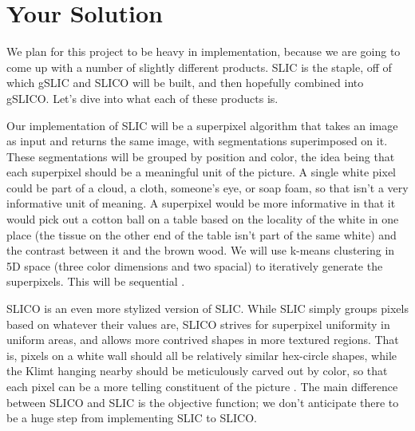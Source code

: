 \documentclass[11pt]{article}
\begin{document}


\section {Your Solution}\label{soln}

We plan for this project to be heavy in implementation, because we are going to come up with a number of slightly different products. SLIC is the staple, off of which gSLIC and SLICO will be built, and then hopefully combined into gSLICO. Let's dive into what each of these products is.

Our implementation of SLIC will be a superpixel algorithm that takes an image as input and returns the same image, with segmentations superimposed on it. These segmentations will be grouped by position and color, the idea being that each superpixel should be a meaningful unit of the picture. A single white pixel could be part of a cloud, a cloth, someone's eye, or soap foam, so that isn't a very informative unit of meaning. A superpixel would be more informative in that it would pick out a cotton ball on a table based on the locality of the white in one place (the tissue on the other end of the table isn't part of the same white) and the contrast between it and the brown wood. We will use k-means clustering in 5D space (three color dimensions and two spacial) to iteratively generate the superpixels. This will be sequential \cite{slic}.

SLICO is an even more stylized version of SLIC. While SLIC simply groups pixels based on whatever their values are, SLICO strives for superpixel uniformity in uniform areas, and allows more contrived shapes in more textured regions. That is, pixels on a white wall should all be relatively similar hex-circle shapes, while the Klimt hanging nearby should be meticulously carved out by color, so that each pixel can be a more telling constituent of the picture \cite{slic2012}. The main difference between SLICO and SLIC is the objective function; we don't anticipate there to be a huge step from implementing SLIC to SLICO.
\end{document}
